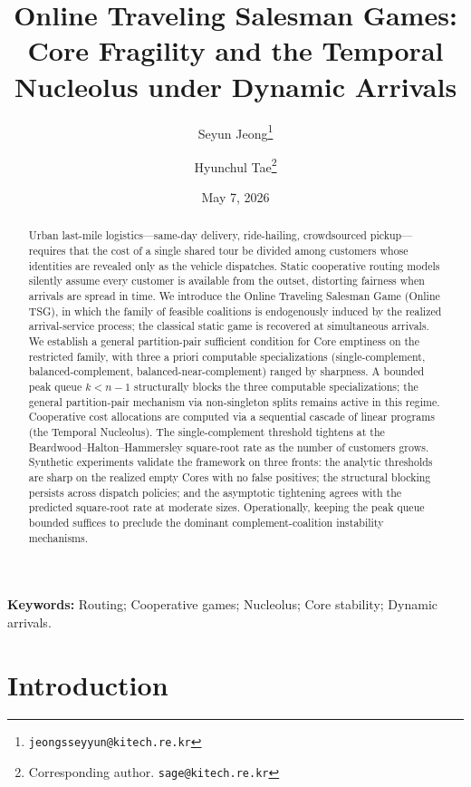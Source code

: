 \documentclass[11pt]{article}
\title{\textbf{Online Traveling Salesman Games: \\ Core Fragility and the Temporal Nucleolus under Dynamic Arrivals}}
\author[1]{Seyun Jeong\thanks{\texttt{jeongsseyyun@kitech.re.kr}}}
\author[1]{Hyunchul Tae\thanks{Corresponding author. \texttt{sage@kitech.re.kr}}}
\affil[1]{Korea Institute of Industrial Technology (KITECH), 303 Jeonghyu-ro, Dongnam-gu, Cheonan 31056, Republic of Korea}
\date{May 7, 2026}
\theoremstyle{plain}
\theoremstyle{definition}
\theoremstyle{remark}
\begin{document}
\maketitle

\begin{abstract}
\noindent Urban last-mile logistics---same-day delivery, ride-hailing, crowdsourced pickup---requires that the cost of a single shared tour be divided among customers whose identities are revealed only as the vehicle dispatches. Static cooperative routing models silently assume every customer is available from the outset, distorting fairness when arrivals are spread in time. We introduce the Online Traveling Salesman Game (Online TSG), in which the family of feasible coalitions is endogenously induced by the realized arrival-service process; the classical static game is recovered at simultaneous arrivals. We establish a general partition-pair sufficient condition for Core emptiness on the restricted family, with three a priori computable specializations (single-complement, balanced-complement, balanced-near-complement) ranged by sharpness. A bounded peak queue $k<n-1$ structurally blocks the three computable specializations; the general partition-pair mechanism via non-singleton splits remains active in this regime. Cooperative cost allocations are computed via a sequential cascade of linear programs (the Temporal Nucleolus). The single-complement threshold tightens at the Beardwood--Halton--Hammersley square-root rate as the number of customers grows. Synthetic experiments validate the framework on three fronts: the analytic thresholds are sharp on the realized empty Cores with no false positives; the structural blocking persists across dispatch policies; and the asymptotic tightening agrees with the predicted square-root rate at moderate sizes. Operationally, keeping the peak queue bounded suffices to preclude the dominant complement-coalition instability mechanisms.
\end{abstract}

\noindent\textbf{Keywords:} Routing; Cooperative games; Nucleolus; Core stability; Dynamic arrivals.

\section{Introduction}
\label{sec:introduction}
\end{document}
